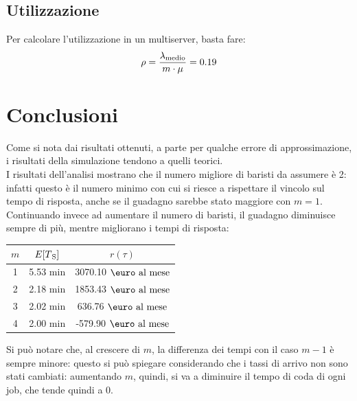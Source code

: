 \documentclass[a4paper, 12pt]{article}
\begin{document}
\subsection{Utilizzazione}
Per calcolare l'utilizzazione in un multiserver, basta fare:
\[
\begin{aligned}
  \rho = \frac{\lambda\textsubscript{medio}}{m \cdot \mu} = 0.19
\end{aligned}
\]

\newpage
\section{Conclusioni}
Come si nota dai risultati ottenuti, a parte per qualche errore di
approssimazione, i risultati della simulazione tendono a quelli
teorici.\\
I risultati dell'analisi mostrano che il numero migliore di baristi da assumere
è 2: infatti questo è il numero minimo con cui si riesce a rispettare il
vincolo sul tempo di risposta, anche se il guadagno sarebbe stato maggiore con
$m = 1$. Continuando invece ad aumentare il numero di baristi, il guadagno
diminuisce sempre di più, mentre migliorano i tempi di risposta:
\bigskip 
\begin{center}
\begin{tabular}{ |c|c|c| }
  \hline
  $m$ & $E[T\textsubscript{S}]$ & $r(\tau)$ \\
  \hline
  \hline
  1 & 5.53 min & 3070.10 $\mbox{\euro}\text{ al mese}$ \\
  \hline
  2 & 2.18 min & 1853.43 $\mbox{\euro}\text{ al mese}$ \\
  \hline
  3 & 2.02 min & 636.76 $\mbox{\euro}\text{ al mese}$ \\
  \hline
  4 & 2.00 min & -579.90 $\mbox{\euro}\text{ al mese}$ \\
  \hline
\end{tabular}
\end{center}

Si può notare che, al crescere di $m$, la differenza dei tempi con il caso $m
- 1$ è sempre minore: questo si può spiegare considerando che i tassi di arrivo
non sono stati cambiati: aumentando $m$, quindi, si va a diminuire il tempo di
coda di ogni job, che tende quindi a 0.
\end{document}
